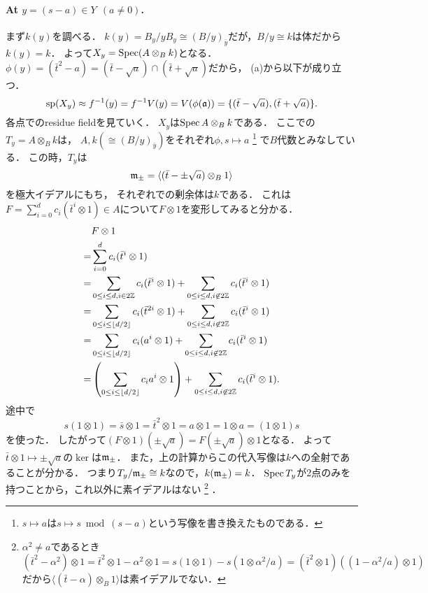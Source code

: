 \documentclass[a4paper]{jsarticle}
\newcommand{\basesp}{\operatorname{sp}}
\begin{document}
    \paragraph{At $y=(s-a) \in Y ~~(a \neq 0)$.}
    まず$k(y)$を調べる．
    $k(y)=B_y/yB_y \cong (B/y)_{\bar{y}}$だが，$B/y \cong k$は体だから$k(y)=k$．
    よって$X_y=\operatorname{Spec} (A \otimes_B k)$となる．
    $\phi(y)=(\bar{t}^2-a)=(\bar{t}-\sqrt{a}) \cap (\bar{t}+\sqrt{a})$だから，
    (a)から以下が成り立つ．
    \[
        \basesp(X_y) \homeo
        f^{-1}(y)=f^{-1}V(y)=V(\phi(\I{a}))=\{ (\bar{t}-\sqrt{a}), (\bar{t}+\sqrt{a}) \}.
    \]
    各点でのresidue fieldを見ていく．
    $X_y$は$\operatorname{Spec} A \otimes_B k$である．
    ここでの$T_y=A \otimes_B k$は，
    $A,k(\cong (B/y)_{\bar{y}})$をそれぞれ$\phi, s \mapsto a$
    \footnote{$s \mapsto a$は$s \mapsto s \bmod (s-a)$という写像を書き換えたものである．}
    で$B$代数とみなしている．
    この時，$T_y$は
    \[ \mathfrak{m}_{\pm}=\langle (\bar{t}-\pm \sqrt{a})\otimes_B 1 \rangle \]を極大イデアルにもち，
    それぞれでの剰余体は$k$である．
    これは$F=\sum_{i=0}^d c_i(\bar{t}^i \otimes 1) \in A$について$F \otimes 1$を変形してみると分かる．
    \begin{align*}
        {}& F \otimes 1 \\
        =& \sum_{i=0}^d c_i(\bar{t}^i \otimes 1) \\
        =&  \sum_{0 \leq i \leq d, i \in 2\mathbb{Z}} c_i(\bar{t}^i \otimes 1)+\sum_{0 \leq i \leq d, i \not \in 2\mathbb{Z}} c_i(\bar{t}^i \otimes 1) \\
        =&  \sum_{0 \leq i \leq \lfloor d/2 \rfloor} c_i(\bar{t}^{2i} \otimes 1)+\sum_{0 \leq i \leq d, i \not \in 2\mathbb{Z}} c_i(\bar{t}^i \otimes 1) \\
        =&  \sum_{0 \leq i \leq \lfloor d/2 \rfloor} c_i(a^i \otimes 1)+\sum_{0 \leq i \leq d, i \not \in 2\mathbb{Z}} c_i(\bar{t}^i \otimes 1) \\
        =&  \left(\sum_{0 \leq i \leq \lfloor d/2 \rfloor} c_ia^i \otimes 1\right)+\sum_{0 \leq i \leq d, i \not \in 2\mathbb{Z}} c_i(\bar{t}^i \otimes 1).
    \end{align*}
    途中で
    \[ s(1 \otimes 1)=\bar{s} \otimes 1=\bar{t}^2 \otimes 1=a \otimes 1=1 \otimes a=(1 \otimes 1)s \]
    を使った．
    したがって$(F \otimes 1)(\pm \sqrt{a})=F(\pm \sqrt{a}) \otimes 1$となる．
    よって$\bar{t} \otimes 1 \mapsto \pm \sqrt{a}$の$\ker$は$\mathfrak{m}_{\pm}$．
    また，上の計算からこの代入写像は$k$への全射であることが分かる．
    つまり$T_y/\mathfrak{m}_{\pm} \cong k$なので，$k(\mathfrak{m}_{\pm})=k$．
    $\operatorname{Spec} T_y$が2点のみを持つことから，これ以外に素イデアルはない
    \footnote
    {
        $\alpha^2 \neq a$であるとき
        \[
            (\bar{t}^2-\alpha^2) \otimes 1
            =\bar{t}^2 \otimes 1-\alpha^2 \otimes 1
            =s(1 \otimes 1)-s(1 \otimes \alpha^2/a)
            =(\bar{t}^2 \otimes 1)((1-\alpha^2/a) \otimes 1)
        \]
        だから$\langle (\bar{t}-\alpha)\otimes_B 1 \rangle$は素イデアルでない．
    }
    ．
\end{document}
